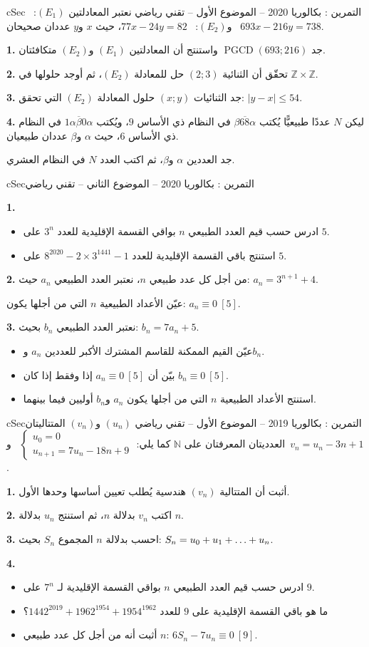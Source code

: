\documentclass[12pt,a4paper]{article}
\newenvironment{BOX}[2]{\begin{otherlanguage}{english}\begin{arbox}{#1}{#2}}{\end{arbox}\end{otherlanguage}}
\newcounter{exo}
\newenvironment{tamrin}[1]{\stepcounter{exo}\begin{BOX}{cSec}{التمرين \theexo: #1}}{\end{BOX}}
\renewcommand{\dots}{\mathinner{\ldotp\ldotp\ldotp}}
\newcommand{\N}{\mathbb{N}}
\newcommand{\Z}{\mathbb{Z}}
\newcommand{\pgcd}{\operatorname{PGCD}}
\newenvironment{sq}{\begin{itemize}[leftmargin=2.4em,itemsep=3pt]}{\end{itemize}}
\newcommand{\qa}{\item[(أ)]}\newcommand{\qb}{\item[(ب)]}\newcommand{\qc}{\item[(جـ)]}\newcommand{\qd}{\item[(د)]}\newcommand{\qe}{\item[(هـ)]}
\newcommand{\QQ}[1]{\par\smallskip\textbf{#1.} }
\begin{document}
\begin{tamrin}{بكالوريا 2020 -- الموضوع الأول -- تقني رياضي}
نعتبر المعادلتين $(E_1)$: \ $693x-216y=738$ \ و$(E_2)$: \ $77x-24y=82$، حيث $x$ و$y$ عددان صحيحان.
\QQ{1} جد $\pgcd(693;216)$ واستنتج أن المعادلتين $(E_1)$ و$(E_2)$ متكافئتان.
\QQ{2} تحقّق أن الثنائية $(2;3)$ حل للمعادلة $(E_2)$، ثم أوجد حلولها في $\Z\times\Z$.
\QQ{3} جد الثنائيات $(x;y)$ حلول المعادلة $(E_2)$ التي تحقق: $|y-x|\le 54$.
\QQ{4} ليكن $N$ عددًا طبيعيًّا يُكتب $\overline{\beta 68\alpha}$ في النظام ذي الأساس $9$، ويُكتب $\overline{1\alpha\beta 0\alpha}$ في النظام ذي الأساس $6$، حيث $\alpha$ و$\beta$ عددان طبيعيان.

جد العددين $\alpha$ و$\beta$، ثم اكتب العدد $N$ في النظام العشري.
\end{tamrin}

\begin{tamrin}{بكالوريا 2020 -- الموضوع الثاني -- تقني رياضي}
\QQ{1}
\begin{sq}
\qa ادرس حسب قيم العدد الطبيعي $n$ بواقي القسمة الإقليدية للعدد $3^n$ على $5$.
\qb استنتج باقي القسمة الإقليدية للعدد $8^{2020}-2\times 3^{1441}-1$ على $5$.
\end{sq}
\QQ{2} من أجل كل عدد طبيعي $n$، نعتبر العدد الطبيعي $a_n$ حيث: $a_n=3^{n+1}+4$.

عيّن الأعداد الطبيعية $n$ التي من أجلها يكون: $a_n\equiv 0\ [5]$.
\QQ{3} نعتبر العدد الطبيعي $b_n$ بحيث: $b_n=7a_n+5$.
\begin{sq}
\qa عيّن القيم الممكنة للقاسم المشترك الأكبر للعددين $a_n$ و$b_n$.
\qb بيّن أن $a_n\equiv 0\ [5]$ إذا وفقط إذا كان $b_n\equiv 0\ [5]$.
\qc استنتج الأعداد الطبيعية $n$ التي من أجلها يكون $a_n$ و$b_n$ أوليين فيما بينهما.
\end{sq}
\end{tamrin}

\begin{tamrin}{بكالوريا 2019 -- الموضوع الأول -- تقني رياضي}
$(u_n)$ و$(v_n)$ المتتاليتان العدديتان المعرفتان على $\N$ كما يلي: $\begin{cases}u_0=0\\ u_{n+1}=7u_n-18n+9\end{cases}$ \ و\ $v_n=u_n-3n+1$.
\QQ{1} أثبت أن المتتالية $(v_n)$ هندسية يُطلب تعيين أساسها وحدها الأول.
\QQ{2} اكتب $v_n$ بدلالة $n$، ثم استنتج $u_n$ بدلالة $n$.
\QQ{3} احسب بدلالة $n$ المجموع $S_n$ بحيث: $S_n=u_0+u_1+\dots+u_n$.
\QQ{4}
\begin{sq}
\qa ادرس حسب قيم العدد الطبيعي $n$ بواقي القسمة الإقليدية لـ $7^n$ على $9$.
\qb ما هو باقي القسمة الإقليدية على $9$ للعدد $1442^{2019}+1962^{1954}+1954^{1962}$؟
\qc أثبت أنه من أجل كل عدد طبيعي $n$: $6S_n-7u_n\equiv 0\ [9]$.
\end{sq}
\end{tamrin}
\end{document}

